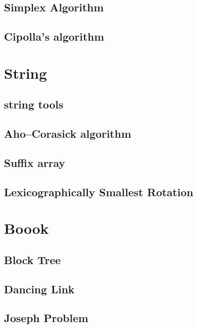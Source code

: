\documentclass[a4paper,10pt,twocolumn,oneside]{article}
\begin{document}
\subsection{Simplex Algorithm}


\subsection{Cipolla's algorithm}


\section{String}
\subsection{string tools}


\subsection{Aho–Corasick algorithm}


\subsection{Suffix array}


\subsection{Lexicographically Smallest Rotation}

\section{Boook}

\subsection{Block Tree}


\subsection{Dancing Link}


\subsection{Joseph Problem}

\end{document}
